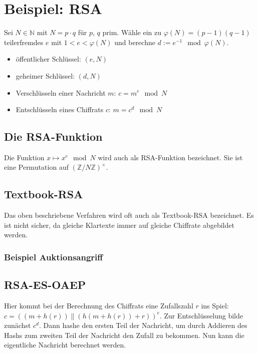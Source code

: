 \documentclass[a4paper,twoside,DIV15,BCOR12mm]{scrbook}
\begin{document}
\section{Beispiel: RSA}

Sei $N \in \mathbb{N}$ mit $N = p \cdot q$ für $p$, $q$ prim. Wähle ein zu $\varphi(N) = (p-1)(q-1)$ teilerfremdes $e$ mit $1 < e < \varphi(N)$ und berechne $d := e^{-1} \mod \varphi(N)$.

\begin{itemize}
	\item öffentlicher Schlüssel: $(e, N)$
	\item geheimer Schlüssel: $(d, N)$
	\item Verschlüsseln einer Nachricht $m$: $c = m^e \mod N$
	\item Entschlüsseln eines Chiffrats $c$: $m = c^d \mod N$
\end{itemize}

\subsection{Die RSA-Funktion}

Die Funktion $x \mapsto x^e \mod N$ wird auch als RSA-Funktion bezeichnet. Sie ist eine Permutation auf $(\mathbb{Z}/N\mathbb{Z})^\times$.

\subsection{Textbook-RSA}

Das oben beschriebene Verfahren wird oft auch als Textbook-RSA bezeichnet.  Es ist nicht sicher, da gleiche Klartexte immer auf gleiche Chiffrate abgebildet werden.

\subsubsection{Beispiel Auktionsangriff}


\subsection{RSA-ES-OAEP} \label{rsa-es-oaep}

Hier kommt bei der Berechnung des Chiffrats eine Zufallszahl $r$ ins Spiel: $c = ((m + h(r)) \| (h(m + h(r)) +r))^e$. Zur Entschlüsselung bilde zunächst $c^d$. Dann hashe den ersten Teil der Nachricht, um durch Addieren des Hashs zum zweiten Teil der Nachricht den Zufall zu bekommen. Nun kann die eigentliche Nachricht berechnet werden.
\end{document}
